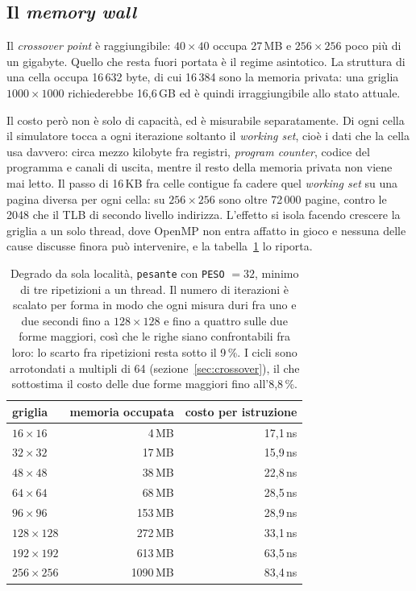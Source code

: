 \subsection{Il \emph{memory wall}}
\label{sec:memoria}

Il \emph{crossover point} è raggiungibile: $40\times40$ occupa 27\,MB e
$256\times256$ poco più di un gigabyte. Quello che resta fuori portata è il
regime asintotico. La struttura di una cella occupa 16\,632 byte, di cui
16\,384 sono la memoria privata: una griglia $1000 \times 1000$ richiederebbe
16,6\,GB ed è quindi irraggiungibile allo stato attuale.

Il costo però non è solo di capacità, ed è misurabile separatamente. Di ogni
cella il simulatore tocca a ogni iterazione soltanto il \emph{working set},
cioè i dati che la cella usa davvero: circa mezzo kilobyte fra registri,
\emph{program counter}, codice del programma e canali di uscita, mentre il resto
della memoria privata non viene mai letto. Il passo di 16\,KB fra celle contigue
fa cadere quel \emph{working set} su una pagina diversa per ogni cella: su $256\times256$ sono oltre 72\,000 pagine, contro le 2048 che il
TLB di secondo livello indirizza. L'effetto si isola facendo crescere la griglia a un solo
thread, dove OpenMP non entra affatto in gioco e nessuna delle cause discusse
finora può intervenire, e la tabella~\ref{tab:memoria} lo riporta.

\begin{table}[htbp]
    \centering
    \begin{tabular}{lrr}
        \toprule
        griglia & memoria occupata & costo per istruzione \\
        \midrule
        $16\times16$   & 4\,MB     & 17,1\,ns \\
        $32\times32$   & 17\,MB    & 15,9\,ns \\
        $48\times48$   & 38\,MB    & 22,8\,ns \\
        $64\times64$   & 68\,MB    & 28,5\,ns \\
        $96\times96$   & 153\,MB   & 28,9\,ns \\
        $128\times128$ & 272\,MB   & 33,1\,ns \\
        $192\times192$ & 613\,MB   & 63,5\,ns \\
        $256\times256$ & 1090\,MB  & 83,4\,ns \\
        \bottomrule
    \end{tabular}
    \caption{Degrado da sola località, \texttt{pesante} con \texttt{PESO} $=32$, minimo
             di tre ripetizioni a un thread. Il
             numero di iterazioni è scalato per forma in modo che ogni misura
             duri fra uno e due secondi fino a $128\times128$ e fino a quattro
             sulle due forme maggiori, così che le righe siano confrontabili fra
             loro: lo scarto fra ripetizioni resta sotto il 9\,\%. I cicli sono
             arrotondati a multipli di 64 (sezione~\ref{sec:crossover}), il che
             sottostima il costo delle due forme maggiori fino all'8,8\,\%.}
    \label{tab:memoria}
\end{table}

